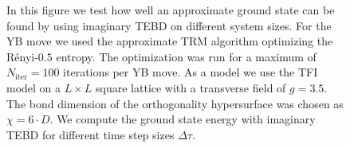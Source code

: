 \begin{figure}
\begin{minipage}{1.0\textwidth}
	\end{minipage}
	\caption{In this figure we test how well an approximate ground state can be found by using imaginary TEBD on different system sizes. For the YB move we used the approximate TRM algorithm optimizing the Rényi-$0.5$ entropy. The optimization was run for a maximum of $N_\text{iter} = 100$ iterations per YB move. As a model we use the TFI model on a $L\times L$ square lattice with a transverse field of $g = 3.5$. The bond dimension of the orthogonality hypersurface was chosen as $\chi=6\cdot D$. We compute the ground state energy with imaginary TEBD for different time step sizes $\Delta\tau$.}
	\label{fig:tfi_gs_energy_vs_dtau_larger_systems}
\end{figure}